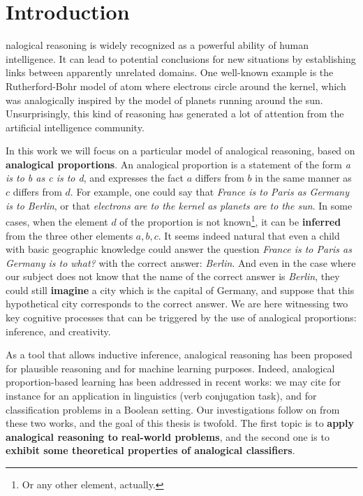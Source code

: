 \chapter*{Introduction}
nalogical reasoning is widely recognized as a powerful ability of
human intelligence.  It can lead to potential conclusions for new situations by
establishing links between apparently unrelated domains. One well-known example
is the Rutherford-Bohr model of atom where electrons circle around the kernel,
which was analogically inspired by the model of planets running around the sun.
Unsurprisingly, this kind of reasoning has generated a lot of attention from
the artificial intelligence community.

In this work we will focus on a particular model of analogical reasoning,
based on \textbf{analogical proportions}. An analogical proportion is a
statement of the form \textit{a is to b as c is to d}, and expresses the fact
$a$ differs from $b$ in the same manner as $c$ differs from $d$. For example,
one could say that \textit{France is to Paris as Germany is to Berlin}, or that
\textit{electrons are to the kernel as planets are to the sun}. In some cases,
when the element $d$ of the proportion is not known\footnote{Or any other
element, actually.}, it can be \textbf{inferred} from the three other elements
$a, b, c$. It seems indeed natural that even a child with basic geographic
knowledge could answer the question \textit{France is to Paris as Germany is to
what?} with the correct answer: \textit{Berlin}. And even in the case where our
subject does not know that the name of the correct answer is \textit{Berlin},
they could still \textbf{imagine} a city  which is the capital of Germany, and
suppose that this hypothetical city corresponds to the correct answer. We are
here witnessing two key cognitive processes that can be triggered by the use
of analogical proportions: inference, and creativity.

As a tool that allows inductive inference, analogical reasoning has been
proposed for plausible reasoning and for machine learning purposes. Indeed,
analogical proportion-based learning has been addressed in recent works: we may
cite for instance \cite{StrYvoCNLL05} for an application in linguistics (verb
conjugation task), and \cite{BayMicDelIJCAI07} for classification problems in a
Boolean setting. Our investigations follow on from these two works, and the
goal of this thesis is twofold. The first topic is to \textbf{apply analogical
reasoning to real-world problems}, and the second one is to \textbf{exhibit
some theoretical properties of analogical classifiers}.


